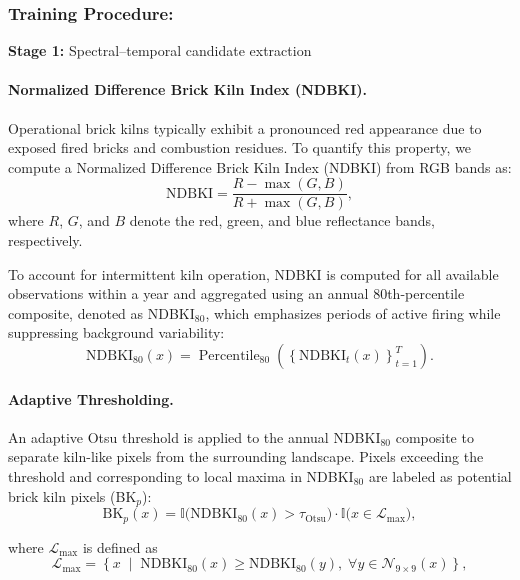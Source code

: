 \documentclass{article}
\theoremstyle{plain}
\theoremstyle{definition}
\theoremstyle{remark}
\begin{document}
\subsubsection{Training Procedure:}

\textbf{Stage 1:} Spectral--temporal candidate extraction

\paragraph{Normalized Difference Brick Kiln Index (NDBKI).} Operational brick kilns typically exhibit a pronounced red appearance
due to exposed fired bricks and combustion residues.
To quantify this property, we compute a Normalized Difference Brick Kiln Index
(NDBKI) from RGB bands as:
\begin{equation}
\mathrm{NDBKI} =
\frac{R - \max(G, B)}{R + \max(G, B)},
\end{equation}
where $R$, $G$, and $B$ denote the red, green, and blue reflectance bands,
respectively.

To account for intermittent kiln operation,
NDBKI is computed for all available observations within a year
and aggregated using an annual 80th-percentile composite,
denoted as NDBKI$_{80}$, which emphasizes periods of active firing
while suppressing background variability:
\begin{equation}
\mathrm{NDBKI}_{80}(x)
=
\operatorname{Percentile}_{80}
\left(
\left\{ \mathrm{NDBKI}_t(x) \right\}_{t=1}^{T}
\right).
\end{equation}

\paragraph{Adaptive Thresholding.}
An adaptive Otsu threshold is applied to the annual NDBKI$_{80}$ composite to separate kiln-like pixels from the surrounding landscape. Pixels exceeding the threshold and corresponding to local maxima in NDBKI$_{80}$ are labeled as potential brick kiln pixels 
(BK$_p$):
\begin{equation}
\mathrm{BK}_p(x) =
\mathbb{I}\big( \mathrm{NDBKI}_{80}(x) > \tau_{\mathrm{Otsu}} \big)
\cdot
\mathbb{I}\big( x \in \mathcal{L}_{\mathrm{max}} \big),
\end{equation}

where $\mathcal{L}_{\mathrm{max}}$ is defined as
\begin{equation}
\mathcal{L}_{\mathrm{max}} =
\left\{
x \;\middle|\;
\mathrm{NDBKI}_{80}(x) \ge \mathrm{NDBKI}_{80}(y),
\;\forall y \in \mathcal{N}_{9\times9}(x)
\right\},
\label{eq:local_max}
\end{equation}
\end{document}
